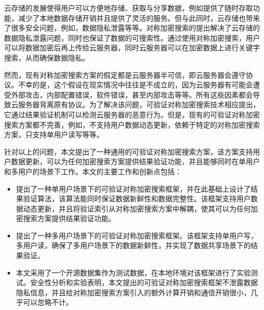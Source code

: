\begin{cabstract}
  云存储的发展使得用户可以方便地存储、获取与分享数据，例如提供了随时存取功能，减少了本地数据存储开销并且提供了灵活的服务。但与此同时，云存储也带来了很多安全问题，例如，数据隐私泄露等等。对称加密搜索的提出解决了云存储的数据隐私泄露问题，同时也保证了数据的可搜索性。通过使用对称加密搜索，用户可以将数据加密后再上传给云服务器，同时云服务器可以在加密数据上进行关键字搜索，从而确保数据隐私。

  然而，现有对称加密搜索方案的假定都是云服务器半可信，即云服务器会遵守协议。不幸的是，这个假设在现实情况中往往是不成立的，因为云服务器有可能会遭受外部攻击，内部配置错误，软件错误，甚至内部攻击等等。所有这些因素都会导致云服务器背离原有协议。为了解决该问题，可验证对称加密搜索技术相应提出，它通过结果验证机制可以检测云服务器的恶意行为。但是，现有的可验证对称加密搜索方案都不完善，例如，不支持用户数据动态更新，依赖于特定的对称加密搜索方案，只支持单用户读写等等。

  针对以上的问题，本文提出了一种通用的可验证对称加密搜索方案，该方案支持用户数据更新，可以为任何加密搜索方案提供结果验证功能，并且能够同时在单用户和多用户的场景下工作。本文的主要工作和创新点包括：

  \begin{itemize}
    \item 提出了一种单用户场景下的可验证对称加密搜索框架，并在此基础上设计了结果验证算法，该算法能同时保证数据新鲜性和数据完整性。该框架支持用户数据动态更新，并且将验证索引从对称加密搜索方案中解耦，使其可以为任何加密搜索方案提供结果验证功能。
    \item 提出了一种多用户场景下的可验证对称加密搜索框架。该框架支持单用户写，多用户读，确保了多用户场景下的数据新鲜性，并实现了数据共享场景下的结果验证。
    \item 本文采用了一个开源数据集作为测试数据，在本地环境对该框架进行了实验测试。安全性分析和实验表明，本文提出的可验证对称加密搜索框架不泄露数据隐私信息，并且给对称加密搜索方案引入的额外计算开销和通信开销很小，几乎可以忽略不计。
  \end{itemize}

\end{cabstract}



